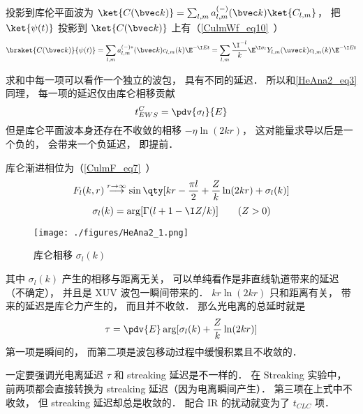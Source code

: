 投影到库伦平面波为 $\ket{C(\bvec k)} = \sum_{l,m} a_{l,m}^{(-)}(\bvec k) \ket{C_{l,m}}$， 把 $\ket{\psi(t)}$ 投影到 $\ket{C(\bvec k)}$ 上有（\autoref{CulmWf_eq10}~）
\begin{equation}
\braket{C(\bvec k)}{\psi(t)} = \sum_{l,m} a_{l,m}^{(-)*}(\bvec k) c_{l,m}(k) \E^{-\I E t} 
= \sum_{l,m} \frac{\I^{-l}}{k} \E^{\I\sigma_l} Y_{l,m} (\uvec k) c_{l,m}(k) \E^{-\I E t}
\end{equation}

求和中每一项可以看作一个独立的波包， 具有不同的延迟． 所以和\autoref{HeAna2_eq3} 同理， 每一项的延迟仅由库仑相移贡献
\begin{equation}
t_{EWS}^C = \pdv{\sigma_l}{E}
\end{equation}
但是库仑平面波本身还存在不收敛的相移 $-\eta\ln (2kr)$， 这对能量求导以后是一个负的， 会带来一个负延迟， 即提前．

库仑渐进相位为（\autoref{CulmF_eq7}~）
\begin{equation}
F_l(k, r) \overset{r\to \infty}{\longrightarrow} \sin\qty[kr - \frac{\pi l}{2} + \frac{Z}{k}\ln(2kr) + \sigma_l(k)] %
\end{equation}
\begin{equation}
\sigma_l(k) = \arg[\Gamma(l+1-\I Z/k)] \qquad (Z > 0)
\end{equation}
\begin{figure}[ht]
\centering
\texttt{[image: ./figures/HeAna2\_1.png]}
\caption{库仑相移 $\sigma_l(k)$} \label{HeAna2_fig1}
\end{figure}
其中 $\sigma_l(k)$ 产生的相移与距离无关， 可以单纯看作是非直线轨道带来的延迟（不确定）， 并且是 XUV 波包一瞬间带来的． $kr\ln(2kr)$ 只和距离有关， 带来的延迟是库仑力产生的， 而且并不收敛． 那么光电离的总延时就是
\begin{equation}
\tau = \pdv{E} \arg[\sigma_l(k) + \frac{Z}{k}\ln(2kr)] %
\end{equation}
第一项是瞬间的， 而第二项是波包移动过程中缓慢积累且不收敛的．

一定要强调光电离延迟 $\tau$ 和 streaking 延迟是不一样的． 在 Streaking 实验中， 前两项都会直接转换为 streaking 延迟（因为电离瞬间产生）． 第三项在上式中不收敛， 但 streaking 延迟却总是收敛的． 配合 IR 的扰动就变为了 $t_{CLC}$ 项．


